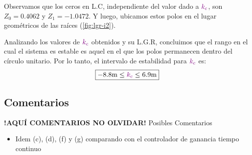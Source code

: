 Observamos que los ceros en L.C, independiente del valor dado a \(\mathbin{\color{violet}k_c}\),
son $Z_{0} = 0.4062 $ y $Z_{1} = -1.0472$. Y luego, ubicamos estos polos en el
lugar geométricos de las raíces (\autoref{fig:lgr-i2}).

Analizando los valores de \(\mathbin{\color{violet}k_c}\) obtenidos y su L.G.R, concluimos que el
rango en el cual el sistema es estable es aquel en el que los polos permanecen
dentro del círculo unitario. Por lo tanto, el intervalo de estabilidad para \(\mathbin{\color{violet}k_c}\) es:
\begin{equation}
  \boxed{ -8.8\unit{m} \leq \mora{k_{c}} \leq 6.9\unit{m} }
\end{equation}

\FloatBarrier
\subsection{Comentarios}


\textbf{!AQUÍ COMENTARIOS NO OLVIDAR!}
Posibles Comentarios
\begin{itemize}
    \item Idem (c), (d), (f) y (g) comparando con el controlador de ganancia tiempo continuo
\end{itemize}

